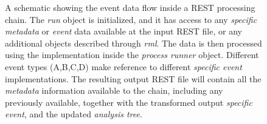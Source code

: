\begin{figure}[htb!]
  \centering
	\caption{A schematic showing the event data flow inside a REST processing chain. The \emph{run} object is initialized, and it has access to any \emph{specific metadata} or \emph{event} data available at the input REST file, or any additional objects described through \emph{rml}. The data is then processed using the implementation inside the \emph{process runner} object. Different event types (A,B,C,D) make reference to different \emph{specific event} implementations. The resulting output REST file will contain all the \emph{metadata} information available to the chain, including any previously available, together with the transformed output \emph{specific event}, and the updated \emph{analysis tree}.  }\label{fig:processing}
\end{figure}




